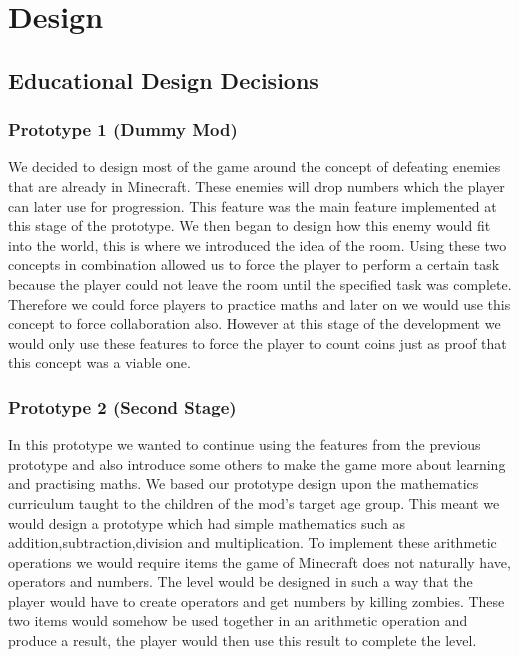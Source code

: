 \chapter{Design}
\label{ch:design}

\section{Educational Design Decisions}
\subsection{Prototype 1 (Dummy Mod)}
We decided to design most of the game around the concept of defeating enemies that are already in Minecraft. These enemies will drop numbers which the player can later use for progression. This feature was the main feature implemented at this stage of the prototype. We then began to design how this enemy would fit into the world, this is where we introduced the idea of the room. Using these two concepts in combination allowed us to force the player to perform a certain task because the player could not leave the room until the specified task was complete. Therefore we could force players to practice maths and later on we would use this concept to force collaboration also. However at this stage of the development we would only use these features to force the player to count coins just as proof that this concept was a viable one.

\subsection{Prototype 2 (Second Stage)}
In this prototype we wanted to continue using the features from the previous prototype and also introduce some others to make the game more about learning and practising maths. We based our prototype design upon the mathematics curriculum taught to the children of the mod’s target age group. This meant we would design a prototype which had simple mathematics such as addition,subtraction,division and multiplication. To implement these arithmetic operations we would require items the game of Minecraft does not naturally have, operators and numbers. The level would be designed in such a way that the player would have to create operators and get numbers by killing zombies. These two items would somehow be used together in an arithmetic operation and produce a result, the player would then use this result to complete the level.

